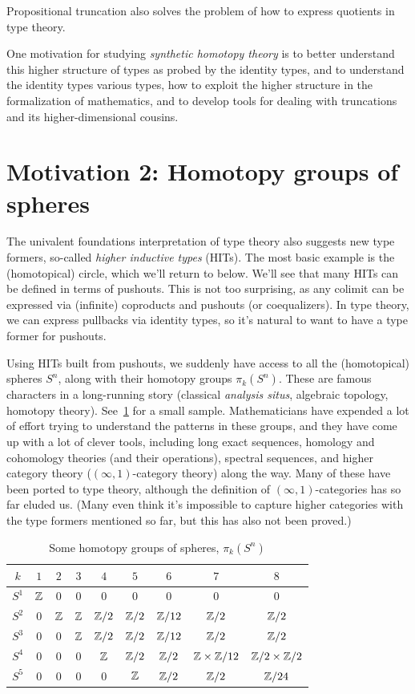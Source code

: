 \documentclass[10pt,oneside,leqno,openright]{memoir}
\begin{document}
Propositional truncation also solves the problem of how to express quotients in type theory.

One motivation for studying \emph{synthetic homotopy theory} is to better
understand this higher structure of types as probed by the identity types, and
to understand the identity types various types, how to exploit the higher
structure in the formalization of mathematics, and to develop tools for dealing
with truncations and its higher-dimensional cousins.

\section{Motivation 2: Homotopy groups of spheres}

The univalent foundations interpretation of type theory also suggests new type formers,
so-called \emph{higher inductive types} (HITs). The most basic example is the (homotopical) circle, which we'll return to below. We'll see that many HITs can be defined in terms of pushouts. This is not too surprising, as any colimit can be expressed via (infinite) coproducts and pushouts (or coequalizers). In type theory, we can express pullbacks via identity types, so it's natural to want to have a type former for pushouts.

Using HITs built from pushouts, we suddenly have access to all the (homotopical)
spheres $S^n$, along with their homotopy groups $\pi_k(S^n)$. These are famous
characters in a long-running story (classical \emph{analysis situs}, algebraic
topology, homotopy theory). See~\cref{tab:pi-k-s-n} for a small
sample. Mathematicians have expended a lot of effort trying to understand the
patterns in these groups, and they have come up with a lot of clever tools,
including long exact sequences, homology and cohomology theories (and their
operations), spectral sequences, and higher category theory
($(\infty,1)$-category theory) along the way. Many of these have been ported to
type theory, although the definition of $(\infty,1)$-categories has so far
eluded us. (Many even think it's impossible to capture higher categories with
the type formers mentioned so far, but this has also not been proved.)

\begin{table}
  \centering
  \begin{tabular}{ccccccccc}\toprule
    $k$ & $1$ & $2$ & $3$ & $4$ & $5$ & $6$ & $7$ & $8$ \\ \midrule
    $S^1$ & $\mathbb{Z}$ & $0$ & $0$ & $0$ & $0$ & $0$ & $0$ & $0$ \\
    $S^2$ & $0$ & $\mathbb{Z}$ & $\mathbb{Z}$ & $\mathbb{Z}/2$ & $\mathbb{Z}/2$ & $\mathbb{Z}/12$ & $\mathbb{Z}/2$ & $\mathbb{Z}/2$ \\
    $S^3$ & $0$ & $0$ & $\mathbb{Z}$ & $\mathbb{Z}/2$ & $\mathbb{Z}/2$ & $\mathbb{Z}/12$ & $\mathbb{Z}/2$ & $\mathbb{Z}/2$ \\
    $S^4$ & $0$ & $0$ & $0$ & $\mathbb{Z}$ & $\mathbb{Z}/2$ & $\mathbb{Z}/2$ & $\mathbb{Z}\times \mathbb{Z}/12$ & $\mathbb{Z}/2\times\mathbb{Z}/2$ \\
    $S^5$ & $0$ & $0$ & $0$ & $0$ & $\mathbb{Z}$ & $\mathbb{Z}/2$ & $\mathbb{Z}/2$ & $\mathbb{Z}/24$ \\ \bottomrule
  \end{tabular}
  \caption{Some homotopy groups of spheres, $\pi_k(S^n)$}
  \label{tab:pi-k-s-n}
\end{table}
\end{document}
